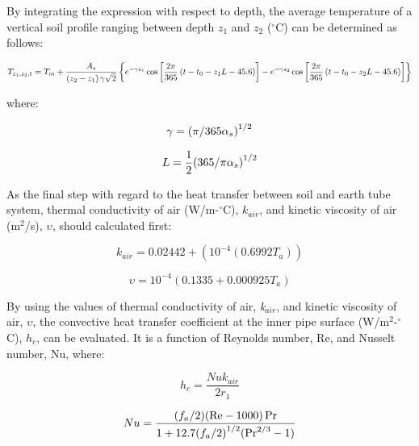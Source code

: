 By integrating the expression with respect to depth, the average temperature of a vertical soil profile ranging between depth \(z_{1}\) and \(z_{2}\) (\(^{\circ}\)C) can be determined as follows:

{\scriptsize
\begin{equation}
{T_{{z_1},{z_2},t}} = {T_m} + \frac{{{A_s}}}{{\left( {{z_2} - {z_1}} \right)\gamma \sqrt 2 }}\left\{ {{e^{ - \gamma {z_1}}}\cos \left[ {\frac{{2\pi }}{{{\rm{365}}}}\left( {t - {t_0} - {z_1}L - 45.6} \right)} \right] - {e^{ - \gamma {z_2}}}\cos \left[ {\frac{{2\pi }}{{{\rm{365}}}}\left( {t - {t_0} - {z_2}L - 45.6} \right)} \right]} \right\}
\end{equation}}

where:

\begin{equation}
\gamma  = {\left( {\pi /{\rm{365}}{\alpha_s}} \right)^{1/2}}
\end{equation}

\begin{equation}
L = \frac{1}{2}{\left( {{\rm{365}}/\pi {\alpha_s}} \right)^{1/2}}
\end{equation}

As the final step with regard to the heat transfer between soil and earth tube system, thermal conductivity of air (W/m-\(^{\circ}\)C), \(k_{air}\), and kinetic viscosity of air (m\(^{2}\)/s), \({\upsilon}\), should calculated first:

\begin{equation}
{k_{air}} = 0.02442 + ({10^{ - 4}}(0.6992{T_a}))
\end{equation}

\begin{equation}
\upsilon  = {10^{ - 4}}(0.1335 + 0.000925{T_a})
\end{equation}

By using the values of thermal conductivity of air, \emph{k\(_{air}\)}, and kinetic viscosity of air, \({\upsilon}\), the convective heat transfer coefficient at the inner pipe surface (W/m\(^{2}\)-\(^{\circ}\)C), \({h_c}\), can be evaluated. It is a function of Reynolds number, Re, and Nusselt number, Nu, where:

\begin{equation}
{h_c} = \frac{{Nu{k_{air}}}}{{2{r_1}}}
\end{equation}

\begin{equation}
Nu = \frac{{({f_a}/2)({\mathop{\rm Re}\nolimits}  - 1000)\Pr }}{{1 + 12.7{{({f_a}/2)}^{1/2}}({{\Pr }^{2/3}} - 1)}}
\end{equation}

